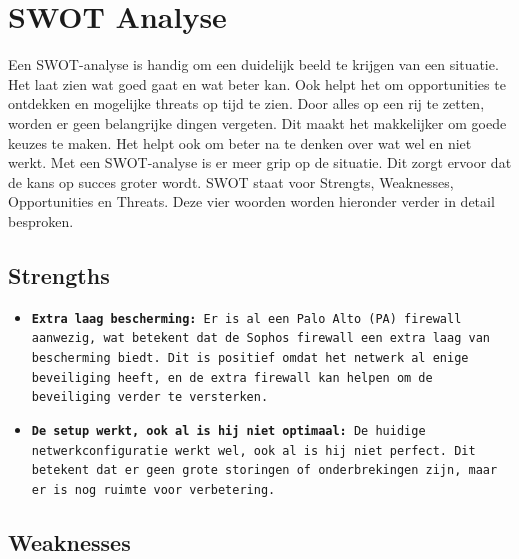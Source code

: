 \section{SWOT Analyse}
Een SWOT-analyse is handig om een duidelijk beeld te krijgen van een situatie. Het laat zien wat goed gaat en wat beter kan. Ook helpt het om opportunities te ontdekken en mogelijke threats op tijd te zien. Door alles op een rij te zetten, worden er geen belangrijke dingen vergeten. Dit maakt het makkelijker om goede keuzes te maken. Het helpt ook om beter na te denken over wat wel en niet werkt. Met een SWOT-analyse is er meer grip op de situatie. Dit zorgt ervoor dat de kans op succes groter wordt. SWOT staat voor Strengts, Weaknesses, Opportunities en Threats. Deze vier woorden worden hieronder verder in detail besproken.


\subsection{Strengths}
\begin{itemize}
\item \texttt{\textbf{Extra laag bescherming:} Er is al een Palo Alto (PA) firewall aanwezig, wat betekent dat de Sophos firewall een extra laag van bescherming biedt. Dit is positief omdat het netwerk al enige beveiliging heeft, en de extra firewall kan helpen om de beveiliging verder te versterken.}

\item \texttt{\textbf{De setup werkt, ook al is hij niet optimaal:} De huidige netwerkconfiguratie werkt wel, ook al is hij niet perfect. Dit betekent dat er geen grote storingen of onderbrekingen zijn, maar er is nog ruimte voor verbetering.}


\end{itemize}

\subsection{Weaknesses}

